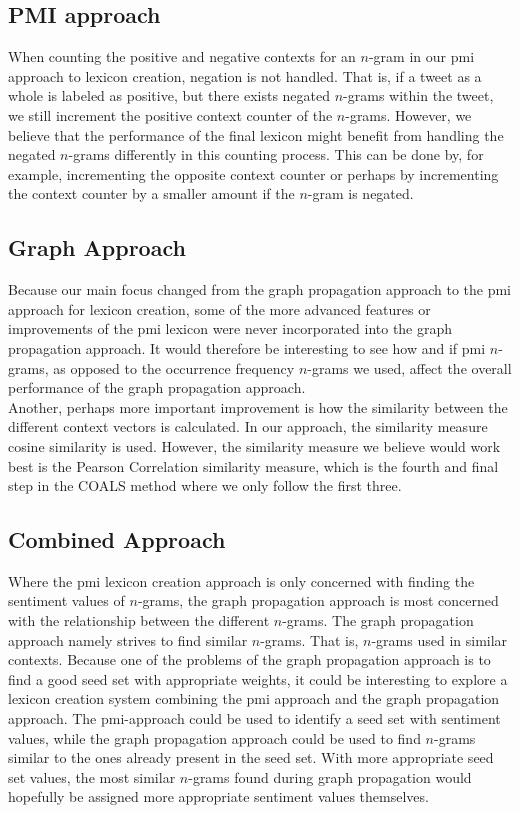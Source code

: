\subsection{PMI approach}
When counting the positive and negative contexts for an $n$-gram in our \ac{pmi} approach to lexicon creation, negation is not handled. That is, if a tweet as a whole is labeled as positive, but there exists negated $n$-grams within the tweet, we still increment the positive context counter of the $n$-grams. However, we believe that the performance of the final lexicon might benefit from handling the negated $n$-grams differently in this counting process. This can be done by, for example, incrementing the opposite context counter or perhaps by incrementing the context counter by a smaller amount if the $n$-gram is negated. \\

\subsection{Graph Approach}
Because our main focus changed from the graph propagation approach to the \ac{pmi} approach for lexicon creation, some of the more advanced features or improvements of the \ac{pmi} lexicon were never incorporated into the graph propagation approach. It would therefore be interesting to see how and if \ac{pmi} $n$-grams, as opposed to the occurrence frequency $n$-grams we used, affect the overall performance of the graph propagation approach.\\

Another, perhaps more important improvement is how the similarity between the different context vectors is calculated. In our approach, the similarity measure cosine similarity is used. However, the similarity measure we believe would work best is the Pearson Correlation similarity measure, which is the fourth and final step in the COALS method where we only follow the first three. \\

\subsection{Combined Approach}
Where the \ac{pmi} lexicon creation approach is only concerned with finding the sentiment values of $n$-grams, the graph propagation approach is most concerned with the relationship between the different $n$-grams. The graph propagation approach namely strives to find similar $n$-grams. That is, $n$-grams used in similar contexts. Because one of the problems of the graph propagation approach is to find a good seed set with appropriate weights, it could be interesting to explore a lexicon creation system combining the \ac{pmi} approach and the graph propagation approach. The \ac{pmi}-approach could be used to identify a seed set with sentiment values, while the graph propagation approach could be used to find $n$-grams similar to the ones already present in the seed set. With more appropriate seed set values, the most similar $n$-grams found during graph propagation would hopefully be assigned more appropriate sentiment values themselves. \\ 

